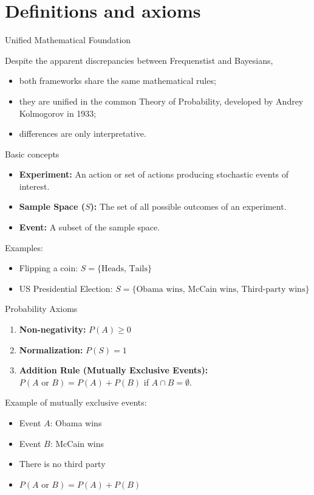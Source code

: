 \documentclass[aspectratio=169]{beamer}
\begin{document}
\section{\large Definitions and axioms}

\begin{frame}{Unified Mathematical Foundation}

    Despite the apparent discrepancies between Frequenstist and Bayesians, 
    \begin{itemize}
        \item both frameworks share the same mathematical rules;
        \item they are unified in the common Theory of Probability, developed by Andrey Kolmogorov in 1933;
        \item differences are only interpretative.
    \end{itemize}
    
\end{frame}

\begin{frame}{Basic concepts}
    \begin{itemize}
        \item \textbf{Experiment:} An action or set of actions producing stochastic events of interest.
        \item \textbf{Sample Space (\(S\)):} The set of all possible outcomes of an experiment.
        \item \textbf{Event:} A subset of the sample space.
    \end{itemize}
    \vspace{0.5cm}
    Examples:
    \begin{itemize}
        \item Flipping a coin: \(S = \{ \text{Heads, Tails} \}\)
        \item US Presidential Election: \(S = \{ \text{Obama wins, McCain wins, Third-party wins} \}\)
    \end{itemize}
\end{frame}

\begin{frame}{Probability Axioms}
    \begin{enumerate}
        \item \textbf{Non-negativity:} \(P(A) \geq 0\)
        \item \textbf{Normalization:} \(P(S) = 1\)
        \item \textbf{Addition Rule (Mutually Exclusive Events):} \(P(A \text{ or } B) = P(A) + P(B)\) if $A\cap B = \emptyset$.
    \end{enumerate}
    \vspace{0.5cm}
    Example of mutually exclusive events:
    \begin{itemize}
        \item Event \(A\): Obama wins
        \item Event \(B\): McCain wins
        \item There is no third party
        \item \(P(A \text{ or } B) = P(A) + P(B)\)
    \end{itemize}
\end{frame}
\end{document}
